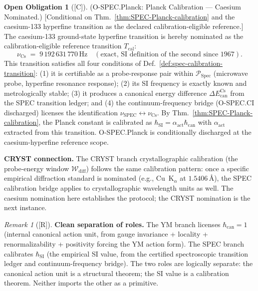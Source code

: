\documentclass[12pt,oneside]{amsbook}
\theoremstyle{plain}
\theoremstyle{definition}
\newtheorem{obligation}[theorem]{Open Obligation}
\theoremstyle{remark}
\newtheorem{remark}[theorem]{Remark}
\newcommand{\status}[1]{\textup{[#1]}}
\begin{document}
\begin{obligation}[\status{C}]\label{ob:SPEC-Planck-calibration}
\textup{(O-SPEC.Planck: Planck Calibration --- Caesium Nominated.)}
\textup{[Conditional on Thm.~\ref{thm:SPEC-Planck-calibration}
and the caesium-133 hyperfine transition as the declared
calibration-eligible reference.]}
The caesium-133 ground-state hyperfine transition is hereby
nominated as the calibration-eligible reference transition
$T_{\mathrm{cal}}$:
\[
  \nu_{\mathrm{Cs}} \;=\; 9\,192\,631\,770\,\mathrm{Hz}
  \quad(\text{exact, SI definition of the second since 1967}).
\]
This transition satisfies all four conditions of
Def.~\ref{def:spec-calibration-transition}:
(1) it is certifiable as a probe-response pair within
$\mathcal{P}_{\mathrm{Spec}}$ (microwave probe, hyperfine
resonance response); (2) its SI frequency is exactly known and
metrologically stable; (3) it produces a canonical energy
difference $\Delta E_{\mathrm{can}}^{\mathrm{Cs}}$ from the
SPEC transition ledger; and (4) the continuum-frequency bridge
(O-SPEC.CI discharged) licenses the identification
$\nu_{\mathrm{SPEC}} \leftrightarrow \nu_{\mathrm{Cs}}$.
By Thm.~\ref{thm:SPEC-Planck-calibration}, the Planck constant
is calibrated as $\hbar_{\mathrm{SI}} = \alpha_{\mathrm{act}}
\hbar_{\mathrm{can}}$ with $\alpha_{\mathrm{act}}$ extracted
from this transition.  O-SPEC.Planck is conditionally discharged
at the caesium-hyperfine reference scope.

\medskip
\textbf{CRYST connection.}  The CRYST branch crystallographic
calibration (the probe-energy window $\mathcal{W}_{\mathrm{diff}}$)
follows the same calibration pattern: once a specific empirical
diffraction standard is nominated (e.g., Cu~K$_\alpha$ at
$1.5406$\,\AA), the SPEC calibration bridge applies to crystallographic
wavelength units as well.  The caesium nomination here establishes
the protocol; the CRYST nomination is the next instance.
\end{obligation}

\begin{remark}[\status{R}]\label{rem:SPEC-Planck-canonical}
\textbf{Clean separation of roles.}
The YM branch licenses $\hbar_{\mathrm{can}}=1$ (internal canonical
action unit, from gauge invariance + locality + renormalizability +
positivity forcing the YM action form). The SPEC branch calibrates
$\hbar_{\mathrm{SI}}$ (the empirical SI value, from the certified
spectroscopic transition ledger and continuum-frequency bridge). The
two roles are logically separate: the canonical action unit is a
structural theorem; the SI value is a calibration theorem. Neither
imports the other as a primitive.
\end{remark}
\end{document}
